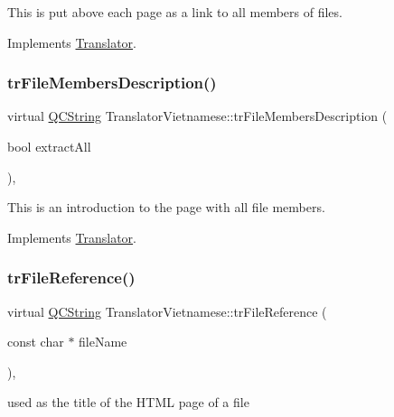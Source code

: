 This is put above each page as a link to all members of files. 

Implements \mbox{\hyperlink{class_translator}{Translator}}.

\mbox{\label{class_translator_vietnamese_a653e6b26b384ab0c82a2d6f4ed022c92}} 
\subsubsection{\texorpdfstring{trFileMembersDescription()}{trFileMembersDescription()}}
{\footnotesize\ttfamily virtual \mbox{\hyperlink{class_q_c_string}{Q\+C\+String}} Translator\+Vietnamese\+::tr\+File\+Members\+Description (\begin{DoxyParamCaption}\item[{bool}]{extract\+All }\end{DoxyParamCaption})\hspace{0.3cm}{\ttfamily [inline]}, {\ttfamily [virtual]}}

This is an introduction to the page with all file members. 

Implements \mbox{\hyperlink{class_translator}{Translator}}.

\mbox{\label{class_translator_vietnamese_a7e8bee922dc1908cf7a6fd9daa8cc28e}} 
\subsubsection{\texorpdfstring{trFileReference()}{trFileReference()}}
{\footnotesize\ttfamily virtual \mbox{\hyperlink{class_q_c_string}{Q\+C\+String}} Translator\+Vietnamese\+::tr\+File\+Reference (\begin{DoxyParamCaption}\item[{const char $\ast$}]{file\+Name }\end{DoxyParamCaption})\hspace{0.3cm}{\ttfamily [inline]}, {\ttfamily [virtual]}}

used as the title of the H\+T\+ML page of a file 

